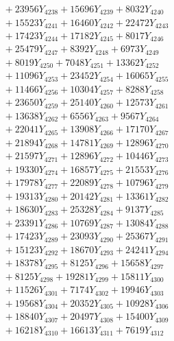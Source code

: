 \documentclass[a4paper,10pt]{article}
\begin{document}
{\begin{align}
&\;  + 23956 Y_{4238} + 15696 Y_{4239} + 8032 Y_{4240} \\[0.3ex]
&\;  + 15523 Y_{4241} + 16460 Y_{4242} + 22472 Y_{4243} \\[0.3ex]
&\;  + 17423 Y_{4244} + 17182 Y_{4245} + 8017 Y_{4246} \\[0.3ex]
&\;  + 25479 Y_{4247} + 8392 Y_{4248} + 6973 Y_{4249} \\[0.3ex]
&\;  + 8019 Y_{4250} + 7048 Y_{4251} + 13362 Y_{4252} \\[0.3ex]
&\;  + 11096 Y_{4253} + 23452 Y_{4254} + 16065 Y_{4255} \\[0.3ex]
&\;  + 11466 Y_{4256} + 10304 Y_{4257} + 8288 Y_{4258} \\[0.5ex]\allowbreak
&\;  + 23650 Y_{4259} + 25140 Y_{4260} + 12573 Y_{4261} \\[0.3ex]
&\;  + 13638 Y_{4262} + 6556 Y_{4263} + 9567 Y_{4264} \\[0.3ex]
&\;  + 22041 Y_{4265} + 13908 Y_{4266} + 17170 Y_{4267} \\[0.3ex]
&\;  + 21894 Y_{4268} + 14781 Y_{4269} + 12896 Y_{4270} \\[0.3ex]
&\;  + 21597 Y_{4271} + 12896 Y_{4272} + 10446 Y_{4273} \\[0.3ex]
&\;  + 19330 Y_{4274} + 16857 Y_{4275} + 21553 Y_{4276} \\[0.3ex]
&\;  + 17978 Y_{4277} + 22089 Y_{4278} + 10796 Y_{4279} \\[0.3ex]
&\;  + 19313 Y_{4280} + 20142 Y_{4281} + 13361 Y_{4282} \\[0.3ex]
&\;  + 18630 Y_{4283} + 25328 Y_{4284} + 9137 Y_{4285} \\[0.3ex]
&\;  + 23391 Y_{4286} + 10769 Y_{4287} + 13084 Y_{4288} \\[0.5ex]\allowbreak
&\;  + 17423 Y_{4289} + 23093 Y_{4290} + 25367 Y_{4291} \\[0.3ex]
&\;  + 15123 Y_{4292} + 18670 Y_{4293} + 24241 Y_{4294} \\[0.3ex]
&\;  + 18378 Y_{4295} + 8125 Y_{4296} + 15658 Y_{4297} \\[0.3ex]
&\;  + 8125 Y_{4298} + 19281 Y_{4299} + 15811 Y_{4300} \\[0.3ex]
&\;  + 11526 Y_{4301} + 7174 Y_{4302} + 19946 Y_{4303} \\[0.3ex]
&\;  + 19568 Y_{4304} + 20352 Y_{4305} + 10928 Y_{4306} \\[0.3ex]
&\;  + 18840 Y_{4307} + 20497 Y_{4308} + 15400 Y_{4309} \\[0.3ex]
&\;  + 16218 Y_{4310} + 16613 Y_{4311} + 7619 Y_{4312} \\[0.3ex]

\end{align}}
\end{document}
